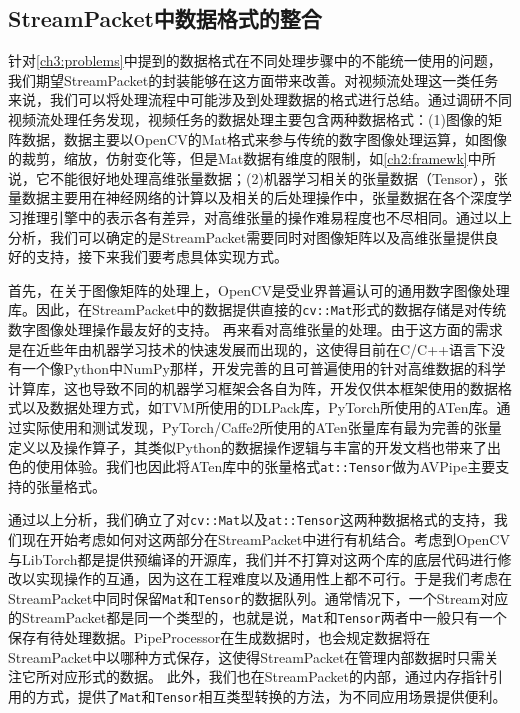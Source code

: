 \subsection{StreamPacket中数据格式的整合}
针对\ref{ch3:problems}中提到的数据格式在不同处理步骤中的不能统一使用的问题，我们期望StreamPacket的封装能够在这方面带来改善。对视频流处理这一类任务来说，我们可以将处理流程中可能涉及到处理数据的格式进行总结。通过调研不同视频流处理任务发现，视频任务的数据处理主要包含两种数据格式：(1)图像的矩阵数据，数据主要以OpenCV的Mat格式来参与传统的数字图像处理运算，如图像的裁剪，缩放，仿射变化等，但是Mat数据有维度的限制，如\ref{ch2:framewk}中所说，它不能很好地处理高维张量数据；(2)机器学习相关的张量数据（Tensor），张量数据主要用在神经网络的计算以及相关的后处理操作中，张量数据在各个深度学习推理引擎中的表示各有差异，对高维张量的操作难易程度也不尽相同。通过以上分析，我们可以确定的是StreamPacket需要同时对图像矩阵以及高维张量提供良好的支持，接下来我们要考虑具体实现方式。\par

首先，在关于图像矩阵的处理上，OpenCV是受业界普遍认可的通用数字图像处理库。因此，在StreamPacket中的数据提供直接的\texttt{cv::Mat}形式的数据存储是对传统数字图像处理操作最友好的支持。
再来看对高维张量的处理。由于这方面的需求是在近些年由机器学习技术的快速发展而出现的，这使得目前在C/C++语言下没有一个像Python中NumPy那样，开发完善的且可普遍使用的针对高维数据的科学计算库，这也导致不同的机器学习框架会各自为阵，开发仅供本框架使用的数据格式以及数据处理方式，如TVM所使用的DLPack\cite{dlpack}库，PyTorch所使用的ATen库。通过实际使用和测试发现，PyTorch/Caffe2所使用的ATen张量库有最为完善的张量定义以及操作算子，其类似Python的数据操作逻辑与丰富的开发文档也带来了出色的使用体验。我们也因此将ATen库中的张量格式\texttt{at::Tensor}做为AVPipe主要支持的张量格式。\par

通过以上分析，我们确立了对\texttt{cv::Mat}以及\texttt{at::Tensor}这两种数据格式的支持，我们现在开始考虑如何对这两部分在StreamPacket中进行有机结合。考虑到OpenCV与LibTorch都是提供预编译的开源库，我们并不打算对这两个库的底层代码进行修改以实现操作的互通，因为这在工程难度以及通用性上都不可行。于是我们考虑在StreamPacket中同时保留\texttt{Mat}和\texttt{Tensor}的数据队列。通常情况下，一个Stream对应的StreamPacket都是同一个类型的，也就是说，\texttt{Mat}和\texttt{Tensor}两者中一般只有一个保存有待处理数据。PipeProcessor在生成数据时，也会规定数据将在StreamPacket中以哪种方式保存，这使得StreamPacket在管理内部数据时只需关注它所对应形式的数据。
此外，我们也在StreamPacket的内部，通过内存指针引用的方式，提供了\texttt{Mat}和\texttt{Tensor}相互类型转换的方法，为不同应用场景提供便利。

